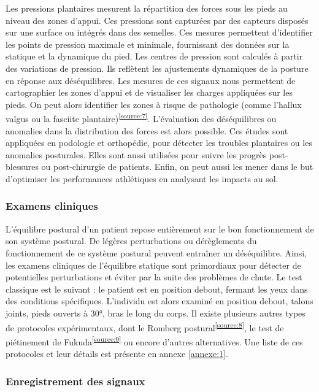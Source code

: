 Les pressions plantaires mesurent la répartition des forces sous les pieds au niveau des zones d’appui. 
Ces pressions sont capturées par des capteurs disposés 
sur une surface ou intégrés dans des semelles. Ces mesures permettent d’identifier les points de pression maximale et minimale, fournissant des données sur la statique et la dynamique du pied.
Les centres de pression sont calculés à partir des variations de pression. 
Ils reflètent les ajustements dynamiques de la posture en réponse aux déséquilibres. 
Les mesures de ces signaux nous permettent de cartographier les zones d'appui et de visualiser les charges appliquées sur les pieds. 
On peut alors identifier les zones à risque de pathologie (comme l’hallux valgus ou la fasciite plantaire)\textsuperscript{\ref{source:7}}. 
L'évaluation des déséquilibres ou anomalies dans la distribution des forces est alors possible. 
Ces études sont appliquées en podologie et orthopédie, pour détecter les troubles plantaires ou les anomalies posturales. 
Elles sont aussi utilisées pour suivre les progrès post-blessures ou post-chirurgie de patients. 
Enfin, on peut aussi les mener dans le but d’optimiser les performances athlétiques en analysant les impacts au sol.

\subsubsection{Examens cliniques}
\label{subsubsec:protocole}

L’équilibre postural d’un patient repose entièrement sur le bon fonctionnement de son système postural. 
De légères perturbations ou dérèglements du fonctionnement de ce système postural peuvent  entraîner un déséquilibre. 
Ainsi, les examens cliniques de l’équilibre statique sont primordiaux pour détecter de potentielles perturbations et éviter par la suite des problèmes de chute. 
Le test classique est le suivant :  le patient est en position debout, fermant les yeux dans des conditions spécifiques.  
L’individu est alors examiné en position debout, talons joints, pieds ouverts à 30°, bras le long du corps. 
Il existe plusieurs autres types de protocoles expérimentaux, dont le Romberg postural\textsuperscript{\ref{source:8}}, le test de piétinement de Fukuda\textsuperscript{\ref{source:9}} ou encore d'autres alternatives.
Une liste de ces protocoles et leur détails est présente en annexe \ref{annexe:1}.

\subsubsection{Enregistrement des signaux}

